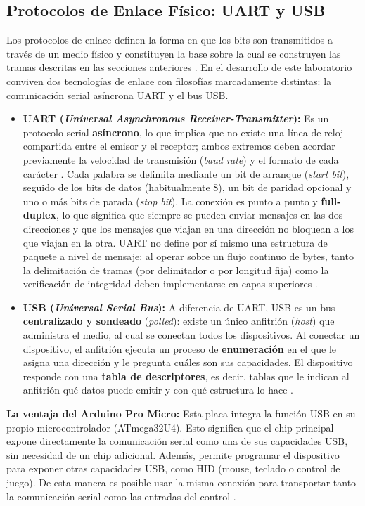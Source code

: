 \documentclass[journal]{IEEEtran}
\begin{document}
\subsection{Protocolos de Enlace Físico: UART y USB}
Los protocolos de enlace definen la forma en que los bits son transmitidos a través de un medio físico y constituyen la base sobre la cual se construyen las tramas descritas en las secciones anteriores \cite{tanenbaum2012}. En el desarrollo de este laboratorio conviven dos tecnologías de enlace con filosofías marcadamente distintas: la comunicación serial asíncrona UART y el bus USB.

\begin{itemize}
    \item \textbf{UART (\textit{Universal Asynchronous Receiver-Transmitter}):} Es un protocolo serial \textbf{asíncrono}, lo que implica que no existe una línea de reloj compartida entre el emisor y el receptor; ambos extremos deben acordar previamente la velocidad de transmisión (\textit{baud rate}) y el formato de cada carácter \cite{stallings2004}. Cada palabra se delimita mediante un bit de arranque (\textit{start bit}), seguido de los bits de datos (habitualmente 8), un bit de paridad opcional y uno o más bits de parada (\textit{stop bit}). La conexión es punto a punto y \textbf{full-duplex}, lo que significa que siempre se pueden enviar mensajes en las dos direcciones y que los mensajes que viajan en una dirección no bloquean a los que viajan en la otra. UART no define por sí mismo una estructura de paquete a nivel de mensaje: al operar sobre un flujo continuo de bytes, tanto la delimitación de tramas (por delimitador o por longitud fija) como la verificación de integridad deben implementarse en capas superiores \cite{tanenbaum2012}.

    \item \textbf{USB (\textit{Universal Serial Bus}):} A diferencia de UART, USB es un bus \textbf{centralizado y sondeado} (\textit{polled}): existe un único anfitrión (\textit{host}) que administra el medio, al cual se conectan todos los dispositivos. Al conectar un dispositivo, el anfitrión ejecuta un proceso de \textbf{enumeración} en el que le asigna una dirección y le pregunta cuáles son sus capacidades. El dispositivo responde con una \textbf{tabla de descriptores}, es decir, tablas que le indican al anfitrión qué datos puede emitir y con qué estructura lo hace \cite{usbhid}.
\end{itemize}

\textbf{La ventaja del Arduino Pro Micro:} Esta placa integra la función USB en su propio microcontrolador (ATmega32U4). Esto significa que el chip principal expone directamente la comunicación serial como una de sus capacidades USB, sin necesidad de un chip adicional. Además, permite programar el dispositivo para exponer otras capacidades USB, como HID (mouse, teclado o control de juego). De esta manera es posible usar la misma conexión para transportar tanto la comunicación serial como las entradas del control \cite{arduino2024}.
\end{document}
